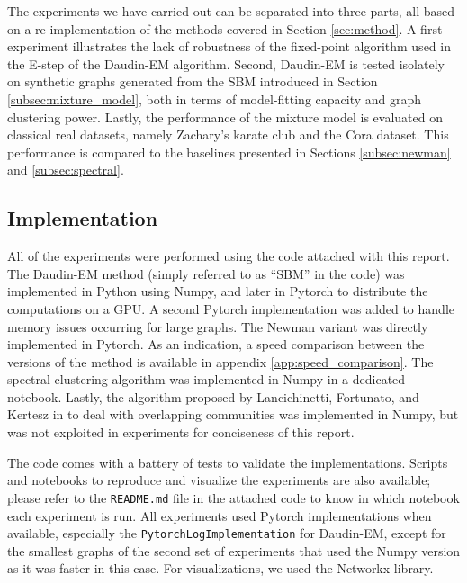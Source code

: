 \documentclass[switch, 12pt]{article}
\begin{document}
\begin{multicols}{2}
    The experiments we have carried out can be separated into three parts, all based on a re-implementation of the methods covered in Section \ref{sec:method}. A first experiment illustrates the lack of robustness of the fixed-point algorithm used in the E-step of the Daudin-EM algorithm.
    Second, Daudin-EM is tested isolately on synthetic graphs generated from the SBM introduced in Section \ref{subsec:mixture_model}, both in terms of model-fitting capacity and graph clustering power.
    Lastly, the performance of the mixture model is evaluated on classical real datasets, namely Zachary's karate club and the Cora dataset. This performance is compared to the baselines presented in Sections \ref{subsec:newman} and \ref{subsec:spectral}.

    \subsection{Implementation}

    All of the experiments were performed using the code attached with this report. The Daudin-EM method (simply referred to as ``SBM'' in the code) was implemented in Python using Numpy, and later in Pytorch to distribute the computations on a GPU. A second Pytorch implementation was added to handle memory issues occurring for large graphs. The Newman variant was directly implemented in Pytorch. As an indication, a speed comparison between the versions of the method is available in appendix \ref{app:speed_comparison}. The spectral clustering algorithm was implemented in Numpy in a dedicated notebook. Lastly, the algorithm proposed by Lancichinetti, Fortunato, and Kertesz in \cite{lancichinetti_detecting_2009} to deal with overlapping communities was implemented in Numpy, but was not exploited in experiments for conciseness of this report.

    The code comes with a battery of tests to validate the implementations. Scripts and notebooks to reproduce and visualize the experiments are also available; please refer to the \texttt{README.md} file in the attached code to know in which notebook each experiment is run. All experiments used Pytorch implementations when available, especially the \texttt{PytorchLogImplementation} for Daudin-EM, except for the smallest graphs of the second set of experiments that used the Numpy version as it was faster in this case. For visualizations, we used the Networkx library.


\end{multicols}
\end{document}
